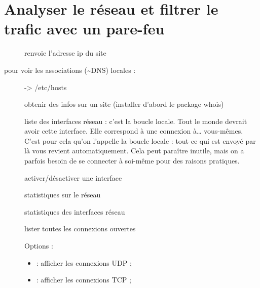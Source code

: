 \documentclass[letterpaper,10pt,french]{sphinxmanual}
\begin{document}
\chapter{Analyser le réseau et filtrer le trafic avec un pare-feu}
\label{\detokenize{18-pare-feu:analyser-le-reseau-et-filtrer-le-trafic-avec-un-pare-feu}}\label{\detokenize{18-pare-feu::doc}}\begin{description}
\item[{}] \leavevmode
renvoie l’adresse ip du site

\item[{pour voir les associations (\textasciitilde{}DNS) locales :}] \leavevmode
-\textgreater{} /etc/hosts

\item[{}] \leavevmode
obtenir des infos sur un site (installer d’abord le package whois)

\item[{}] \leavevmode
liste des interfaces réseau
 : c’est la boucle locale. Tout le monde devrait avoir cette interface. Elle correspond à une connexion à… vous-mêmes. C’est pour cela qu’on l’appelle la boucle locale : tout ce qui est envoyé par là vous revient automatiquement. Cela peut paraître inutile, mais on a parfois besoin de se connecter à soi-même pour des raisons pratiques.

\item[{}] \leavevmode
activer/désactiver une interface

\item[{}] \leavevmode
statistiques sur le réseau

\item[{}] \leavevmode
statistiques des interfaces réseau

\item[{}] \leavevmode
lister toutes les connexions ouvertes

Options :
\begin{itemize}
\item {} 
 : afficher les connexions UDP ;

\item {} 
 : afficher les connexions TCP ;


\end{itemize}
\end{description}
\end{document}
